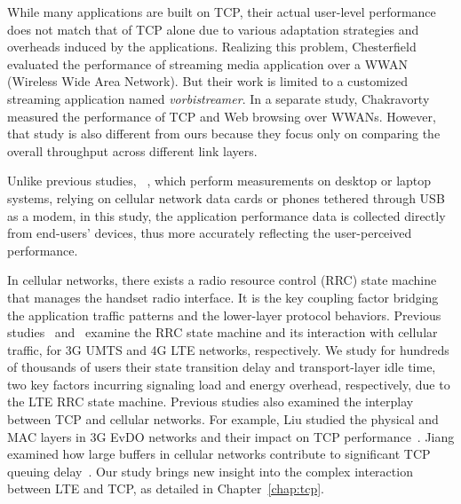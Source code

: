 While many applications are built on TCP, their actual user-level performance does not match that of TCP alone due to various adaptation strategies and overheads induced by the applications. Realizing this problem, Chesterfield \etal~\cite{Chesterfield:3GMultimedia:Monet2004} evaluated the performance of streaming media application over a WWAN (Wireless Wide Area Network). But their work is limited to a customized streaming application named {\em vorbistreamer}. In a separate study, Chakravorty \etal~\cite{Chakravorty:WWAN:Mobicom2004} measured the performance of TCP and Web browsing over WWANs. However, that study is also different from ours because they focus only on comparing the overall throughput across different link layers.

Unlike previous studies, \eg~\cite{Liu:3GChannelAppl:Mobicom2008, Chakravorty:WWAN:Mobicom2004, Jang:3G:MICNET2009}, which perform measurements on desktop or laptop systems, relying on cellular network data cards or phones tethered through USB as a modem, in this study, the application performance data is collected directly from end-users' devices, thus more accurately reflecting the user-perceived performance.

In cellular networks, there exists a radio resource control (RRC) state machine that manages the handset radio interface. It is the key coupling factor bridging the application traffic patterns and the lower-layer protocol behaviors. Previous studies~\cite{imc.3g} and~\cite{huang_mobisys12} examine the RRC state machine and its interaction with cellular traffic, for 3G UMTS and 4G LTE networks, respectively. We study for hundreds of thousands of users their state transition delay and transport-layer idle time, two key factors incurring signaling load and energy overhead, respectively, due to the LTE RRC state machine.
Previous studies also examined the interplay between TCP and cellular networks. For example, Liu \etal studied the physical and MAC layers in 3G EvDO networks and their impact on TCP performance~\cite{Liu:3GChannelAppl:Mobicom2008}. Jiang \etal examined how large buffers in cellular networks contribute to significant TCP queuing delay~\cite{jiang12}. Our study brings new insight into the complex interaction between LTE and TCP, as detailed in Chapter~\ref{chap:tcp}.



